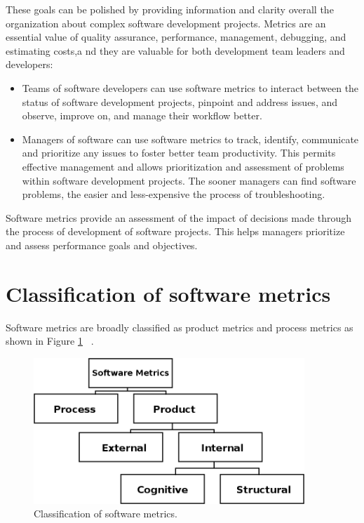 These goals can be polished by providing information and clarity overall the organization about complex software development projects. Metrics are an essential value of quality assurance, performance, management, debugging, and estimating costs,a nd they are valuable for both development team leaders and developers:

\begin{itemize}
	\item Teams of software developers can use software metrics to interact between the status of
	software development projects, pinpoint and address issues, and observe, improve on,
	and manage their workflow better.
	\item Managers of software can use software metrics to track, identify, communicate and prioritize any
	issues to foster better team productivity. This permits effective management and allows
	prioritization and assessment of problems within software development projects. The
	sooner managers can find software problems, the easier and less-expensive the process of troubleshooting.
\end{itemize}

Software metrics provide an assessment of the impact of decisions made through the process of development of software projects. This helps managers prioritize and assess performance goals and objectives.

\section{Classification of software metrics}

Software metrics are broadly classified as product metrics and process metrics as shown in Figure \ref{fig:classification} ~\cite{metrics2}.
\begin{figure}[h]
	\centering
	\includegraphics[height=55mm]{figures/classification.png}
	\caption{Classification of software metrics.}
	\label{fig:classification}
\end{figure}


